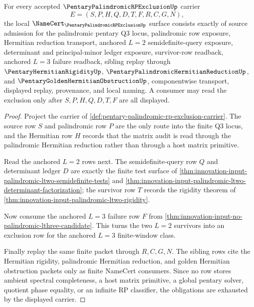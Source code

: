\begin{theorem}
\label{thm:pentary-palindromic-rp-exclusion-obligations}
For every accepted $\PentaryPalindromicRPExclusionUp$ carrier
$$
E=(S,P,H,Q,D,T,F,R,C,G,N),
$$
the local $\NameCert_{\PentaryPalindromicRPExclusionUp}$ surface consists exactly of source admission for the palindromic pentary Q3 locus, palindromic row exposure, Hermitian reduction transport, anchored $L=2$ semidefinite-query exposure, determinant and principal-minor ledger exposure, survivor-row readback, anchored $L=3$ failure readback, sibling replay through $\PentaryHermitianRigidityUp$, $\PentaryPalindromicHermitianReductionUp$, and $\PentaryGoldenHermitianObstructionUp$, componentwise transport, displayed replay, provenance, and local naming. A consumer may read the exclusion only after $S,P,H,Q,D,T,F$ are all displayed.
\end{theorem}
\begin{proof}
Project the carrier of \autoref{def:pentary-palindromic-rp-exclusion-carrier}. The source row $S$ and palindromic row $P$ are the only route into the finite Q3 locus, and the Hermitian row $H$ records that the matrix audit is read through the palindromic Hermitian reduction rather than through a host matrix primitive.

Read the anchored $L=2$ rows next. The semidefinite-query row $Q$ and determinant ledger $D$ are exactly the finite test surface of \autoref{thm:innovation-input-palindromic-ltwo-semidefinite-tests} and \autoref{thm:innovation-input-palindromic-ltwo-determinant-factorization}; the survivor row $T$ records the rigidity theorem of \autoref{thm:innovation-input-palindromic-ltwo-rigidity}.

Now consume the anchored $L=3$ failure row $F$ from \autoref{thm:innovation-input-no-palindromic-lthree-candidate}. This turns the two $L=2$ survivors into an exclusion row for the anchored $L=3$ finite-window class.

Finally replay the same finite packet through $R,C,G,N$. The sibling rows cite the Hermitian rigidity, palindromic Hermitian reduction, and golden Hermitian obstruction packets only as finite NameCert consumers. Since no row stores ambient spectral completeness, a host matrix primitive, a global pentary solver, quotient phase equality, or an infinite RP classifier, the obligations are exhausted by the displayed carrier.
\end{proof}



